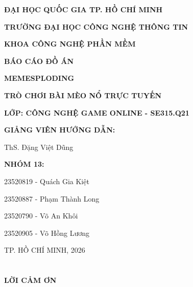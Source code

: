 \documentclass[a4paper]{report}
\begin{document}
\fontsize{13pt}{15.6pt}\selectfont
{}

\begin{titlepage}
    \centering
    \vspace*{1cm}

    {\Large\bfseries ĐẠI HỌC QUỐC GIA TP. HỒ CHÍ MINH}

    {\Large\bfseries TRƯỜNG ĐẠI HỌC CÔNG NGHỆ THÔNG TIN}

    {\Large\bfseries KHOA CÔNG NGHỆ PHẦN MỀM}

    \vspace{2.5cm}

    {\Large\bfseries BÁO CÁO ĐỒ ÁN}

    \vspace{1cm}

    {\LARGE\bfseries MEMESPLODING}

    \vspace{0.4cm}

    {\Large\bfseries TRÒ CHƠI BÀI MÈO NỔ TRỰC TUYẾN}

    \vspace{2.5cm}

    {\large\bfseries LỚP: CÔNG NGHỆ GAME ONLINE - SE315.Q21}

    \vspace{1cm}

    {\large\bfseries GIẢNG VIÊN HƯỚNG DẪN:}

    {\large ThS. Đặng Việt Dũng}

    \vspace{1cm}

    {\large\bfseries NHÓM 13:}

    {\large 23520819 - Quách Gia Kiệt}

    {\large 23520887 - Phạm Thành Long}

    {\large 23520790 - Võ An Khôi}

    {\large 23520905 - Võ Hồng Lương}

    \vfill

    {\large TP. HỒ CHÍ MINH, 2026}
\end{titlepage}

\chapter*{}
\begin{center}
    \Large\bfseries LỜI CẢM ƠN
\end{center}
\end{document}
